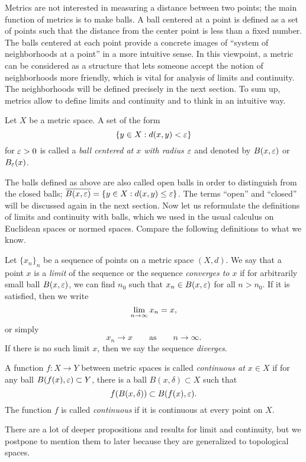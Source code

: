 Metrics are not interested in measuring a distance between two points; the main function of metrics is to make balls.
A ball centered at a point is defined as a set of points such that the distance from the center point is less than a fixed number.
The balls centered at each point provide a concrete images of ``system of neighborhoods at a point'' in a more intuitive sense.
In this viewpoint, a metric can be considered as a structure that lets someone accept the notion of neighborhoods more friendly, which is vital for analysis of limits and continuity.
The neighborhoods will be defined precisely in the next section.
To sum up, metrics allow to define limits and continuity and to think in an intuitive way.

\begin{defn}
Let $X$ be a metric space.
A set of the form 
\[\{y\in X:d(x,y)<\varepsilon\}\]
for $\varepsilon>0$ is called a \emph{ball centered at $x$ with radius $\varepsilon$} and denoted by $B(x,\varepsilon)$ or $B_\varepsilon(x)$.
\end{defn}

The balls defined as above are also called open balls in order to distinguish from the closed balls; $\overline{B(x,\varepsilon)}=\{y\in X:d(x,y)\le\varepsilon\}$.
The terms ``open'' and ``closed'' will be discussed again in the next section.
Now let us reformulate the definitions of limits and continuity with balls, which we used in the usual calculus on Euclidean spaces or normed spaces.
Compare the following definitions to what we know.

\begin{defn}
Let $\{x_n\}_n$ be a sequence of points on a metric space $(X,d)$.
We say that a point $x$ is a \emph{limit} of the sequence or the sequence \emph{converges to $x$} if for arbitrarily small ball $B(x,\varepsilon)$, we can find $n_0$ such that $x_n\in B(x,\varepsilon)$ for all $n>n_0$.
If it is satisfied, then we write
\[\lim_{n\to\oo}x_n=x,\]
or simply
\[x_n\to x\qquad\text{as}\qquad n\to\infty.\]
If there is no such limit $x$, then we say the sequence \emph{diverges}.
\end{defn}
\begin{defn}
A function $f:X\to Y$ between metric spaces is called \emph{continuous at $x\in X$} if for any ball $B(f(x),\varepsilon)\subset Y$, there is a ball $B(x,\delta)\subset X$ such that
\[f(B(x,\delta))\subset B(f(x),\varepsilon).\]
The function $f$ is called \emph{continuous} if it is continuous at every point on $X$.
\end{defn}

There are a lot of deeper propositions and results for limit and continuity, but we postpone to mention them to later because they are generalized to topological spaces.

